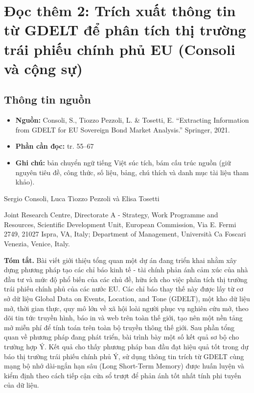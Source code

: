 \chapter{Đọc thêm 2: Trích xuất thông tin từ GDELT để phân tích thị trường trái phiếu chính phủ EU (Consoli và cộng sự)}
\label{ch:M5L3DocThem2}

\section{Thông tin nguồn}

\begin{itemize}
  \item \textbf{Nguồn:} Consoli, S., Tiozzo Pezzoli, L. \& Tosetti, E. ``Extracting Information from GDELT for EU Sovereign Bond Market Analysis.'' Springer, 2021.
  \item \textbf{Phần cần đọc:} tr. 55--67
  \item \textbf{Ghi chú:} bản chuyển ngữ tiếng Việt súc tích, bám cấu trúc nguồn (giữ nguyên tiêu đề, công thức, số liệu, bảng, chú thích và danh mục tài liệu tham khảo).
\end{itemize}

Sergio Consoli, Luca Tiozzo Pezzoli và Elisa Tosetti

Joint Research Centre, Directorate A - Strategy, Work Programme and Resources, Scientific Development Unit, European Commission, Via E. Fermi 2749, 21027 Ispra, VA, Italy; Department of Management, Università Ca\textquotesingle{} Foscari Venezia, Venice, Italy.

\textbf{Tóm tắt.} Bài viết giới thiệu tổng quan một dự án đang triển khai nhằm xây dựng phương pháp tạo các chỉ báo kinh tế - tài chính phản ánh cảm xúc của nhà đầu tư và mức độ phổ biến của các chủ đề, hữu ích cho việc phân tích thị trường trái phiếu chính phủ của các nước EU. Các chỉ báo thay thế này được lấy từ cơ sở dữ liệu Global Data on Events, Location, and Tone (GDELT), một kho dữ liệu mở, thời gian thực, quy mô lớn về xã hội loài người phục vụ nghiên cứu mở, theo dõi tin tức truyền hình, báo in và web trên toàn thế giới, tạo nên một nền tảng mở miễn phí để tính toán trên toàn bộ truyền thông thế giới. Sau phần tổng quan về phương pháp đang phát triển, bài trình bày một số kết quả sơ bộ cho trường hợp Ý. Kết quả cho thấy phương pháp ban đầu đạt hiệu quả tốt trong dự báo thị trường trái phiếu chính phủ Ý, sử dụng thông tin trích từ GDELT cùng mạng bộ nhớ dài-ngắn hạn sâu (Long Short-Term Memory) được huấn luyện và kiểm định theo cách tiếp cận cửa sổ trượt để phản ánh tốt nhất tính phi tuyến của dữ liệu.

